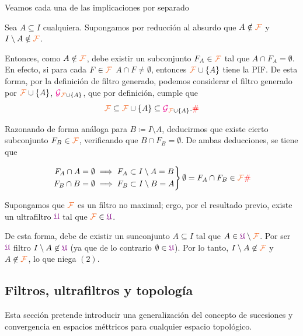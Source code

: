 \documentclass[titlepage,11pt,a4paper]{book}
\newcommand{\filt}{\ensuremath{\textcolor{Orange}{\mathcal{F}}}}
\newcommand{\gilt}{\ensuremath{\textcolor{Magenta}{\mathcal{G}}}}
\newcommand{\ultf}{\ensuremath{\textcolor{Plum}{\mathfrak{U}}}}
\newcommand{\borde}[1]{%
  \begingroup
  \setlength{\fboxsep}{2.5pt}%
  \setlength{\fboxrule}{1pt}%
  \textcolor{black}{\fbox{\normalcolor\ensuremath{#1}}}%
  \hspace{4pt}%
  \vspace{0.5 pt}
  \endgroup
}
\begin{document}
     \begin{dem}
     Veamos cada una de las implicaciones por separado

    \medskip
    \borde{(1) \implies (2)} \medskip Sea $A \subseteq I$ cualquiera. Supongamos por reducción al absurdo que $A \notin \filt$ y $I \setminus A \notin \filt$.
    
    \smallskip
    Entonces, como $A \notin \filt$, debe existir un subconjunto $F_{A} \in \filt$ tal que $A \cap F_{A} = \emptyset$. En efecto, si para cada $F \in \filt$ $A \cap F \neq \emptyset$, entonces $\filt \cup \{A\}$ tiene la PIF. De esta forma, por la definición de filtro generado, podemos considerar el filtro generado por $\filt \cup \{A\}$, $\gilt_{\filt \cup \{A\}}$, que por definición, cumple que
    \[
    \filt \subseteq \filt \cup \{A\} \subseteq \gilt_{\filt \cup \{A\}}. \textcolor{red}{\#}
    \]

    \smallskip
    Razonando de forma análoga para $B \coloneq I \setminus A$, deducirmos que existe cierto subconjunto $F_{B} \in \filt$, verificando que $B \cap F_{B} = \emptyset$. De ambas deducciones, se tiene que

    \[
    \left.
    \begin{aligned}
        F_{A} \cap A = \emptyset& \implies F_{A} \subset I \setminus A = B\\
        F_{B} \cap B  = \emptyset& \implies F_{B} \subset I \setminus B = A
    \end{aligned}
    \right\} \emptyset = F_{A} \cap F_{B} \in \filt \textcolor{red}{\#}
    \]

    \medskip

    \borde{(2) \implies (1)} Supongamos que $\filt$ es un filtro no maximal; ergo, por el resultado previo, existe un ultrafiltro $\ultf$ tal que $\filt \in \ultf$.

    \smallskip
    De esta forma, debe de existir un sunconjunto $A \subseteq I$ tal que $A \in \ultf \setminus \filt$. Por ser $\ultf$ filtro $I \setminus A \not \in \ultf$ (ya que de lo contrario $\emptyset \in \ultf$). Por lo tanto, $I \setminus A \not \in \filt$ y $A \not \in \filt$, lo que niega $(2)$.
     \end{dem}

     \subsection*{Filtros, ultrafiltros y topología}

     Esta sección pretende introducir una generalización del concepto de sucesiones y convergencia en espacios méttricos para cualquier espacio topológico.
\end{document}
